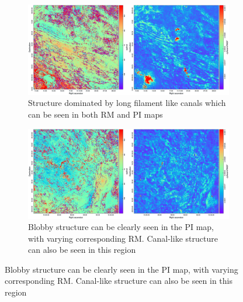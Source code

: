 \begin{figure}
    \centering
     \begin{subfigure}[b]{\textwidth}
        \includegraphics[width=\linewidth]{Thesis_Template/Figures/RM_PI top right.png}
        \caption{Structure dominated by long filament like canals which can be seen in both RM and PI maps}
        \label{fig: canals zoom}
    \end{subfigure}

    
    \vspace*{0.05cm}

    
    \begin{subfigure}[b]{\textwidth}
        \includegraphics[width=\linewidth]{Thesis_Template/Figures/RM_PI bottom right.png}
        \caption{Blobby structure can be clearly seen in the PI map, with varying corresponding RM. Canal-like structure can also be seen in this region}
        \label{fig: blobby zoom}
    \end{subfigure}

    
    \vspace*{0.05cm}


\end{figure}
